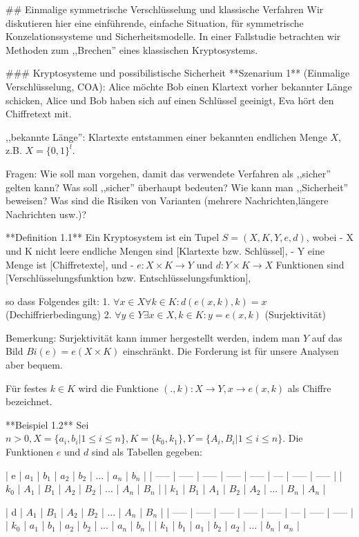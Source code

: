 \documentclass[a4paper]{article}
\begin{document}
\begin{multicols}{3}
    ## Einmalige symmetrische Verschlüsselung und klassische Verfahren
    Wir diskutieren hier eine einführende, einfache Situation, für symmetrische Konzelationssysteme und Sicherheitsmodelle. In einer Fallstudie betrachten wir Methoden zum ,,Brechen'' eines klassischen Kryptosystems.

    ### Kryptosysteme und possibilistische Sicherheit
    **Szenarium 1** (Einmalige Verschlüsselung, COA): Alice möchte Bob einen Klartext vorher bekannter Länge schicken, Alice und Bob haben sich auf einen Schlüssel geeinigt, Eva hört den Chiffretext mit.

    ,,bekannte Länge'': Klartexte entstammen einer bekannten endlichen Menge $X$, z.B. $X=\{0,1\}^l$.

    Fragen: Wie soll man vorgehen, damit das verwendete Verfahren als ,,sicher'' gelten kann? Was soll ,,sicher'' überhaupt bedeuten? Wie kann man ,,Sicherheit'' beweisen? Was sind die Risiken von Varianten (mehrere Nachrichten,längere Nachrichten usw.)?

    **Definition 1.1** Ein Kryptosystem ist ein Tupel $S=(X,K,Y,e,d)$, wobei
    - X und K nicht leere endliche Mengen sind [Klartexte bzw. Schlüssel],
    - Y eine Menge ist [Chiffretexte], und
    - $e:X\times K\rightarrow Y$ und $d:Y\times K\rightarrow X$ Funktionen sind [Verschlüsselungsfunktion bzw. Entschlüsselungsfunktion],

    so dass Folgendes gilt:
    1. $\forall x\in X\forall k\in K:d(e(x,k),k) =x$ (Dechiffrierbedingung)
    2. $\forall y\in Y\exists x\in X,k\in K:y=e(x,k)$ (Surjektivität)

    Bemerkung: Surjektivität kann immer hergestellt werden, indem man $Y$ auf das Bild $Bi(e) =e(X\times K)$ einschränkt. Die Forderung ist für unsere Analysen aber bequem.

    Für festes $k\in K$ wird die Funktione $(.,k):X\rightarrow Y,x \rightarrow e(x,k)$ als Chiffre bezeichnet.

    **Beispiel 1.2** Sei $n>0, X=\{a_i,b_i| 1\leq i\leq n\},K=\{k_0,k_1\},Y=\{A_i,B_i| 1\leq i\leq n\}$. Die Funktionen $e$ und $d$ sind als Tabellen gegeben:

    | e     | $a_1$ | $b_1$ | $a_2$ | $b_2$ | ... | $a_n$ | $b_n$ |
    | ----- | ----- | ----- | ----- | ----- | --- | ----- | ----- |
    | $k_0$ | $A_1$ | $B_1$ | $A_2$ | $B_2$ | ... | $A_n$ | $B_n$ |
    | $k_1$ | $B_1$ | $A_1$ | $B_2$ | $A_2$ | ... | $B_n$ | $A_n$ |

    | d     | $A_1$ | $B_1$ | $A_2$ | $B_2$ | ... | $A_n$ | $B_n$ |
    | ----- | ----- | ----- | ----- | ----- | --- | ----- | ----- |
    | $k_0$ | $a_1$ | $b_1$ | $a_2$ | $b_2$ | ... | $a_n$ | $b_n$ |
    | $k_1$ | $b_1$ | $a_1$ | $b_2$ | $a_2$ | ... | $b_n$ | $a_n$ |


\end{multicols}
\end{document}
